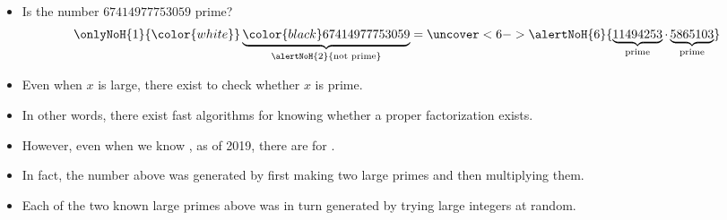 \begin{frame}
\begin{itemize}
\item Is the number $67414977753059$ prime? 
\[
{\onlyNoH{1}{\color{white}} \underbrace{\color{black}67414977753059}_{\alertNoH{2}{\text{not prime}}}} = \uncover<6->{\alertNoH{6}{  \underbrace{ 11494253}_{ \text{prime}} \cdot \underbrace{ 5865103}_{\text{prime}} }}
\]
\item<3-> Even when $x$ is large, there exist  to check whether $x$ is prime.
\item<4-> In other words, there exist fast algorithms for knowing whether a proper factorization exists.
\item<5-> However, even when we know , as of 2019, there are  for .
\item<7-> In fact, the number above was generated by first making two large primes and then multiplying them. 
\item<8-> Each of the two known large primes above was in turn generated by trying large integers at random.
\end{itemize}
\end{frame}